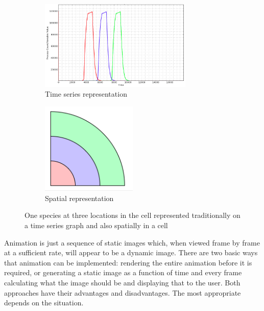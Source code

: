 \begin{figure}[h!]
    \centering
    \begin{subfigure}[b]{0.4\textwidth}
        \centering
        \includegraphics[width=0.8\textwidth]{images/asrc_graph_intro.png}
        \caption{Time series representation}
        \label{fig:asrc_graph_work}
    \end{subfigure}
    \begin{subfigure}[b]{0.4\textwidth}
        \centering
        \includegraphics[width=0.5\textwidth]{images/asrc_cell_intro.png}
        \caption{Spatial representation}
        \label{fig:asrc_cell_work}
    \end{subfigure}
    \caption{One species at three locations in the cell represented traditionally on a time series graph and also spatially in a cell}
    \label{fig:asrc_work}
\end{figure}

Animation is just a sequence of static images which, when viewed frame by frame at a sufficient rate, will appear to be a dynamic image.  There are two basic ways that animation can be implemented: rendering the entire animation before it is required, or generating a static image as a function of time and every frame calculating what the image should be and displaying that to the user.  Both approaches have their advantages and disadvantages.  The most appropriate depends on the situation.

